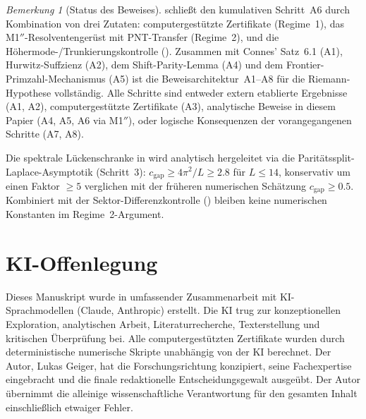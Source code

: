 \documentclass[12pt,a4paper]{article}
\theoremstyle{definition}
\theoremstyle{remark}
\newtheorem{remark}[theorem]{Bemerkung}
\begin{document}
\begin{remark}[Status des Beweises]
\label{rem:M1-status}
 schließt den kumulativen Schritt~A6 durch Kombination von drei Zutaten: computergestützte Zertifikate (Regime~1), das M1$''$-Resolventengerüst mit PNT-Transfer (Regime~2), und die Höhermode-/Trunkierungskontrolle (). Zusammen mit Connes' Satz~6.1 (A1), Hurwitz-Suffzienz (A2), dem Shift-Parity-Lemma (A4) und dem Frontier-Primzahl-Mechanismus (A5) ist die Beweisarchitektur~A1--A8 für die Riemann-Hypothese vollständig. Alle Schritte sind entweder extern etablierte Ergebnisse (A1, A2), computergestützte Zertifikate (A3), analytische Beweise in diesem Papier (A4, A5, A6 via M1$''$), oder logische Konsequenzen der vorangegangenen Schritte (A7, A8).

Die spektrale Lückenschranke in  wird analytisch hergeleitet via die Paritätssplit-Laplace-Asymptotik (Schritt~3): $c_{\mathrm{gap}} \geq 4\pi^2/L \geq 2.8$ für $L \leq 14$, konservativ um einen Faktor $\geq 5$ verglichen mit der früheren numerischen Schätzung $c_{\mathrm{gap}} \geq 0.5$. Kombiniert mit der Sektor-Differenzkontrolle () bleiben keine numerischen Konstanten im Regime~2-Argument.
\end{remark}


\section*{KI-Offenlegung}

Dieses Manuskript wurde in umfassender Zusammenarbeit mit KI-Sprachmodellen (Claude, Anthropic) erstellt. Die KI trug zur konzeptionellen Exploration, analytischen Arbeit, Literaturrecherche, Texterstellung und kritischen \"Uberpr\"ufung bei. Alle computergest\"utzten Zertifikate wurden durch deterministische numerische Skripte unabh\"angig von der KI berechnet. Der Autor, Lukas Geiger, hat die Forschungsrichtung konzipiert, seine Fachexpertise eingebracht und die finale redaktionelle Entscheidungsgewalt ausge\"ubt. Der Autor \"ubernimmt die alleinige wissenschaftliche Verantwortung f\"ur den gesamten Inhalt einschlie\ss lich etwaiger Fehler.




\end{document}
